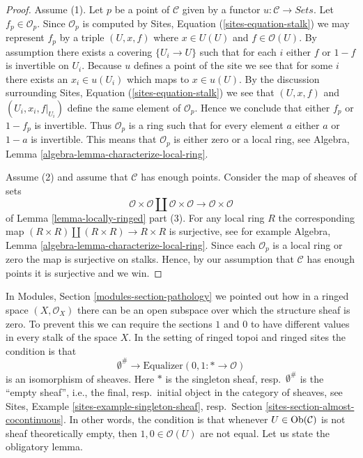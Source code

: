 \begin{proof}
Assume (1). Let $p$ be a point of $\mathcal{C}$ given by a functor
$u : \mathcal{C} \to \textit{Sets}$. Let
$f_p \in \mathcal{O}_p$. Since $\mathcal{O}_p$ is computed by
Sites, Equation (\ref{sites-equation-stalk})
we may represent $f_p$ by a triple
$(U, x, f)$ where $x \in U(U)$ and $f \in \mathcal{O}(U)$.
By assumption there exists a covering $\{U_i \to U\}$
such that for each $i$ either $f$ or $1 - f$ is invertible
on $U_i$. Because $u$ defines a point of the site we see that
for some $i$ there exists an $x_i \in u(U_i)$ which maps to
$x \in u(U)$. By the discussion surrounding
Sites, Equation (\ref{sites-equation-stalk})
we see that $(U, x, f)$ and $(U_i, x_i, f|_{U_i})$ define the
same element of $\mathcal{O}_p$. Hence we conclude that
either $f_p$ or $1 - f_p$ is invertible. Thus
$\mathcal{O}_p$ is a ring such that for every element $a$
either $a$ or $1 - a$ is invertible. This means that $\mathcal{O}_p$
is either zero or a local ring, see
Algebra, Lemma \ref{algebra-lemma-characterize-local-ring}.

\medskip\noindent
Assume (2) and assume that $\mathcal{C}$ has enough points.
Consider the map of sheaves of sets
$$
\mathcal{O} \times \mathcal{O} \amalg \mathcal{O} \times \mathcal{O}
\longrightarrow
\mathcal{O} \times \mathcal{O}
$$
of
Lemma \ref{lemma-locally-ringed} part (3). For any local ring $R$
the corresponding map
$(R \times R) \amalg (R \times R) \to R \times R$
is surjective, see for example
Algebra, Lemma \ref{algebra-lemma-characterize-local-ring}.
Since each $\mathcal{O}_p$ is a local ring or zero the map is
surjective on stalks. Hence, by our assumption that $\mathcal{C}$
has enough points it is surjective and we win.
\end{proof}

\noindent
In
Modules, Section \ref{modules-section-pathology}
we pointed out how in a ringed space $(X, \mathcal{O}_X)$
there can be an open subspace over which the structure sheaf is zero.
To prevent this we can require the sections $1$ and $0$ to have different
values in every stalk of the space $X$. In the setting of ringed topoi
and ringed sites the condition is that
\begin{equation}
\label{equation-one-is-never-zero}
\emptyset^\# \longrightarrow
\text{Equalizer}(0, 1 : * \longrightarrow \mathcal{O})
\end{equation}
is an isomorphism of sheaves. Here $*$ is the singleton sheaf,
resp.\ $\emptyset^\#$ is the ``empty sheaf'',
i.e., the final, resp.\ initial object in the category of sheaves, see
Sites, Example \ref{sites-example-singleton-sheaf},
resp.\ Section \ref{sites-section-almost-cocontinuous}.
In other words, the condition is that whenever $U \in \mathop{\mathrm{Ob}}\nolimits(\mathcal{C})$
is not sheaf theoretically empty, then $1, 0 \in \mathcal{O}(U)$ are not
equal. Let us state the obligatory lemma.

